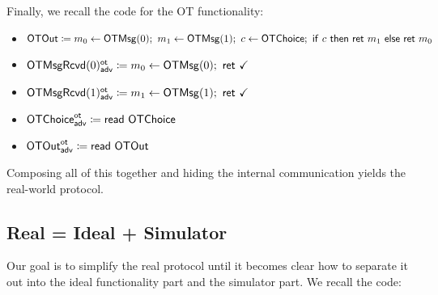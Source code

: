 Finally, we recall the code for the OT functionality:
\begin{itemize}
\item $\OTOut \coloneqq m_0 \leftarrow \OTMsg(0); \ m_1 \leftarrow \OTMsg(1); \ c \leftarrow \OTChoice; \ \ifte{c}{\ret{m_1}}{\ret{m_0}}$
\item {\color{blue} $\LeakOTMsgRcvd(0)^\ot_\adv \coloneqq m_0 \leftarrow \OTMsg(0); \ \ret{\checkmark}$}
\item {\color{blue} $\LeakOTMsgRcvd(1)^\ot_\adv \coloneqq m_1 \leftarrow \OTMsg(1); \ \ret{\checkmark}$}
\item {\color{blue} $\mathsf{OTChoice}^{\mathsf{ot}}_{\mathsf{adv}} \coloneqq \mathsf{read} \ \mathsf{OTChoice}$}
\item {\color{blue} $\mathsf{OTOut}^{\mathsf{ot}}_{\mathsf{adv}} \coloneqq \mathsf{read} \ \mathsf{OTOut}$}
\end{itemize}
Composing all of this together and hiding the internal communication yields the real-world protocol.

\subsection{Real = Ideal + Simulator}
Our goal is to simplify the real protocol until it becomes clear how to separate it out into the ideal functionality part and the simulator part. We recall the code:

